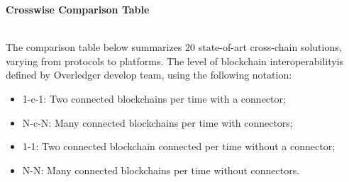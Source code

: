 \begin{huge}
\textbf{Crosswise Comparison Table}
\end{huge}
\\

\noindent The comparison table below summarizes 20 state-of-art cross-chain solutions, varying from protocols to platforms. The level of blockchain interoperability\footnotemark[1] is defined by Overledger develop team, using the following notation:
\begin{itemize}
    \item 1-c-1: Two connected blockchains per time with a connector;
    \item N-c-N: Many connected blockchains per time with connectors;
    \item 1-1: Two connected blockchain connected per time without a connector;
    \item N-N: Many connected blockchains per time without connectors.
\end{itemize}


